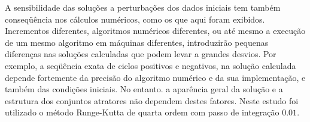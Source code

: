 A sensibilidade das soluções a perturbações dos dados iniciais tem também conseqüência nos cálculos numéricos, como os que aqui foram exibidos. Incrementos diferentes, algoritmos numéricos diferentes, ou até mesmo a execução de um mesmo algoritmo em máquinas diferentes, introduzirão pequenas diferenças nas soluções calculadas que podem levar a grandes desvios. Por exemplo, a seqüência exata de ciclos positivos e negativos, na solução calculada depende fortemente da precisão do algoritmo numérico e da sua implementação, e também das condições iniciais. No entanto. a aparência geral da solução e a estrutura dos conjuntos atratores não dependem destes fatores. Neste estudo foi utilizado o método Runge-Kutta de quarta ordem com passo de integração $0.01$.